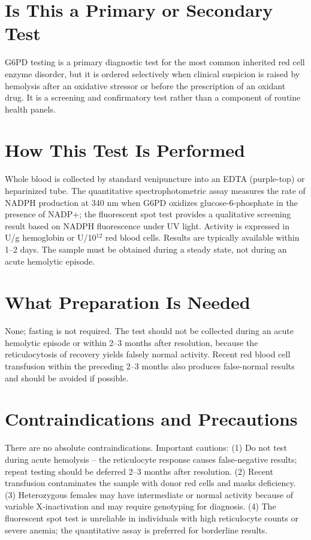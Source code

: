 \section*{Is This a Primary or Secondary Test}
G6PD testing is a primary diagnostic test for the most common inherited red cell enzyme disorder, but it is ordered selectively when clinical suspicion is raised by hemolysis after an oxidative stressor or before the prescription of an oxidant drug. It is a screening and confirmatory test rather than a component of routine health panels.
\section*{How This Test Is Performed}
Whole blood is collected by standard venipuncture into an EDTA (purple-top) or heparinized tube. The quantitative spectrophotometric assay measures the rate of NADPH production at 340 nm when G6PD oxidizes glucose-6-phosphate in the presence of NADP+; the fluorescent spot test provides a qualitative screening result based on NADPH fluorescence under UV light. Activity is expressed in U/g hemoglobin or U/10$^{12}$ red blood cells. Results are typically available within 1--2 days. The sample must be obtained during a steady state, not during an acute hemolytic episode.
\section*{What Preparation Is Needed}
None; fasting is not required. The test should not be collected during an acute hemolytic episode or within 2--3 months after resolution, because the reticulocytosis of recovery yields falsely normal activity. Recent red blood cell transfusion within the preceding 2--3 months also produces false-normal results and should be avoided if possible.
\section*{Contraindications and Precautions}
There are no absolute contraindications. Important cautions: (1) Do not test during acute hemolysis -- the reticulocyte response causes false-negative results; repeat testing should be deferred 2--3 months after resolution. (2) Recent transfusion contaminates the sample with donor red cells and masks deficiency. (3) Heterozygous females may have intermediate or normal activity because of variable X-inactivation and may require genotyping for diagnosis. (4) The fluorescent spot test is unreliable in individuals with high reticulocyte counts or severe anemia; the quantitative assay is preferred for borderline results.
